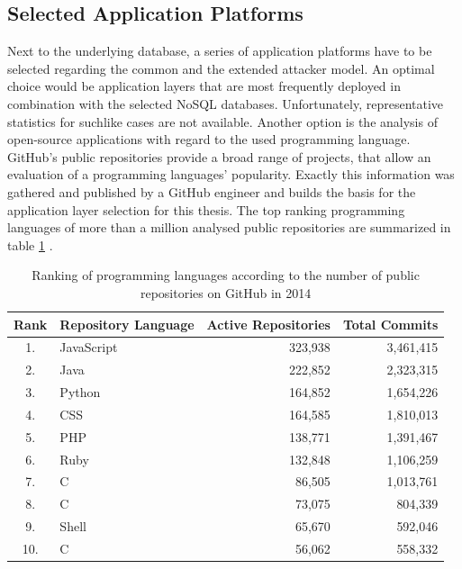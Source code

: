 \subsection{Selected Application Platforms}
Next to the underlying database, a series of application platforms have to be selected regarding the common and the extended attacker model. An optimal choice would be application layers that are most frequently deployed in combination with the selected NoSQL databases. Unfortunately, representative statistics for suchlike cases are not available. Another option is the analysis of open-source applications with regard to the used programming language. GitHub's public repositories provide a broad range of projects, that allow an evaluation of a programming languages' popularity. Exactly this information was gathered and published by a GitHub engineer and builds the basis for the application layer selection for this thesis. The top ranking programming languages of more than a million analysed public repositories are summarized in table \ref{tab:language_ranking} \cite{Zapponi2014}.

\begin{table}[h]
 \sffamily 
 \centering
 \begin{tabular}{clrr}
  \textbf{Rank} & \textbf{Repository Language} & \textbf{Active Repositories} & \textbf{Total Commits} \\ \hline
  \rowcolor{light-gray} 1. &  JavaScript     & 323,938 & 3,461,415 \\
  2. &  Java   & 222,852 & 2,323,315 \\
  \rowcolor{light-gray} 3. &  Python  & 164,852 & 1,654,226 \\
  4. &  CSS       & 164,585 & 1,810,013 \\
  \rowcolor{light-gray}5. &  PHP      & 138,771 & 1,391,467 \\
  \rowcolor{light-gray}6. &  Ruby  & 132,848 & 1,106,259 \\
   7. &  C\scriptsize\raisebox{.5ex}{++} & 86,505 & 1,013,761 \\
  8. &  C & 73,075 & 804,339 \\
  9. &  Shell   & 65,670 & 592,046 \\
  10. &  C\scriptsize\raisebox{.5ex}{\#} & 56,062 & 558,332 \\
  \bottomrule
 \end{tabular}
 \caption{Ranking of programming languages according to the number of public repositories on GitHub in 2014}
 \label{tab:language_ranking}
\end{table}

